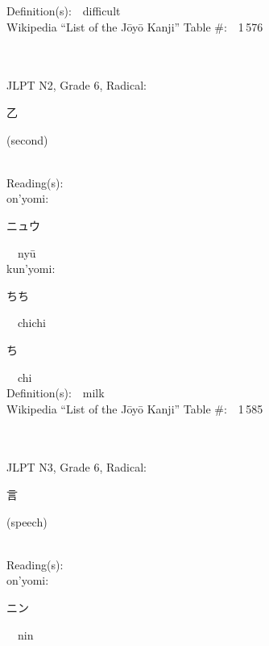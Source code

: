 \begin{multicols}{2}
Definition(s):\ \ difficult \\
Wikipedia ``List of the J\=oy\=o Kanji'' Table \#:\ \ 1\,576 \\
\ \ \\
{\fontsize{34pt}{40pt}  }\ \ \\  %
{JLPT N2, Grade 6, Radical:\ \ {\begin{CJK}{UTF8}{min} 乙 \end{CJK}} (second) } \\
Reading(s):\ \ \\
{\hspace*{1em}}on'yomi:\ \ \\
{\hspace*{2em}}{\begin{CJK}{UTF8}{min} ニュウ \end{CJK}}\ \ ny\=u\ \ \\
{\hspace*{1em}}kun'yomi:\ \ \\
{\hspace*{2em}}{\begin{CJK}{UTF8}{min} ちち \end{CJK}}\ \ chichi\ \ \\
{\hspace*{2em}}{\begin{CJK}{UTF8}{min} ち \end{CJK}}\ \ chi\ \ \\
Definition(s):\ \ milk \\
Wikipedia ``List of the J\=oy\=o Kanji'' Table \#:\ \ 1\,585 \\
\ \ \\
{\fontsize{34pt}{40pt}  }\ \ \\  %
{JLPT N3, Grade 6, Radical:\ \ {\begin{CJK}{UTF8}{min} 言 \end{CJK}} (speech) } \\
Reading(s):\ \ \\
{\hspace*{1em}}on'yomi:\ \ \\
{\hspace*{2em}}{\begin{CJK}{UTF8}{min} ニン \end{CJK}}\ \ nin\ \ \\

\end{multicols}
